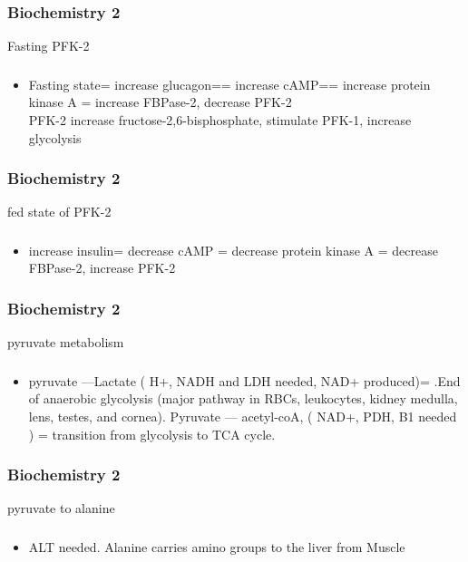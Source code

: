 \documentclass[11pt]{beamer}
\begin{document}
\begin{frame}
 \frametitle{Biochemistry 2}
Fasting PFK-2
\end{frame}

\begin{frame}
 \frametitle{}
\begin{itemize}
\item Fasting state= increase glucagon== increase cAMP== increase protein kinase A = increase FBPase-2, decrease PFK-2 \\ PFK-2 increase fructose-2,6-bisphosphate, stimulate PFK-1, increase glycolysis 
\end{itemize}
\end{frame}

\begin{frame}
 \frametitle{Biochemistry 2}
fed state of PFK-2
\end{frame}

\begin{frame}
 \frametitle{}
\begin{itemize}
\item increase insulin= decrease cAMP = decrease protein kinase A = decrease FBPase-2, increase PFK-2 
\end{itemize}
\end{frame}

\begin{frame}
 \frametitle{Biochemistry 2}
pyruvate metabolism 
\end{frame}

\begin{frame}
 \frametitle{}
\begin{itemize}
\item pyruvate ---Lactate ( H+, NADH and LDH needed, NAD+ produced)= .End of anaerobic glycolysis (major pathway in RBCs, leukocytes, kidney medulla, lens, testes, and cornea).   Pyruvate --- acetyl-coA, ( NAD+, PDH, B1 needed ) = transition from glycolysis to TCA cycle. 
\end{itemize}
\end{frame}

\begin{frame}
 \frametitle{Biochemistry 2}
pyruvate to alanine 
\end{frame}

\begin{frame}
 \frametitle{}
\begin{itemize}
\item ALT needed. Alanine carries amino
groups to the liver from
Muscle
\end{itemize}
\end{frame}
\end{document}
